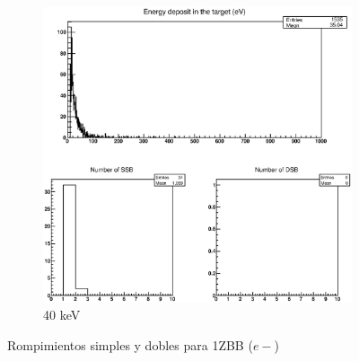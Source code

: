 \begin{figure}
\begin{subfigure}{.5\textwidth}
  \includegraphics[width=.78\linewidth]{./Figures/1zbbe40kev.eps}
  \caption{40 keV}
  \label{fig:subei8}
\end{subfigure}
\caption{Rompimientos simples y dobles para 1ZBB ($e-$)}
\label{fig:e}
\end{figure}





